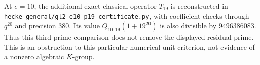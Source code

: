 At $e=10$, the additional exact classical operator $T_{19}$ is
reconstructed in
\texttt{hecke\_general/gl2\_e10\_p19\_certificate.py}, with coefficient
checks through $q^{20}$ and precision $380$.
Its value $Q_{10,19}(1+19^{20})$ is also divisible by $9496386083$.
Thus this third-prime comparison does not remove the displayed residual
prime. This is an obstruction to this particular numerical unit
criterion, not evidence of a nonzero algebraic $K$-group.
